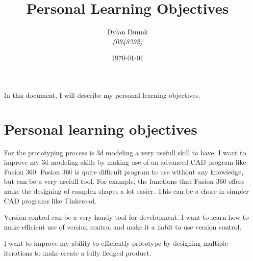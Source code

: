 \documentclass[12pt, a4paper]{article}
\title{\Huge{Personal Learning Objectives} }
\author{Dylan Duunk \\ \textit{(0948392)}}
\date{\today}
\begin{document}
\maketitle

\noindent
In this document, I will describe my personal learning objectives.

\section*{Personal learning objectives}

\begin{description}[align=left]
    \item[3D Modeling] For the prototyping process is 3d modeling a very usefull skill to have.
                       I want to improve my 3d modeling skills by making use of an advanced CAD program like Fusion 360.
                       Fusion 360 is quite difficult program to use without any knowledge, but can be a very usefull tool.
                       For example, the functions that Fusion 360 offers make the designing of complex shapes a lot easier.
                       This can be a chore in simpler CAD programs like Tinkercad.
    \item[Version Control] Version control can be a very handy tool for development.
                           I want to learn how to make efficient use of version control and make it a habit to use version control.
    \item[Prototyping] I want to improve my ability to efficiently prototype by designing multiple iterations to make create a fully-fledged product. 
\end{description}   
\end{document}
